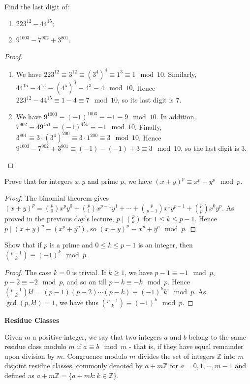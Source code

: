 \begin{prb}
Find the last digit of:
\begin{enumerate}
\item $223^{12}-44^{15}$;
\item $9^{1003}-7^{902}+3^{801}$.
\end{enumerate}
\begin{proof}
\begin{enumerate}
\item We have
$223^{12}\equiv3^{12}\equiv(3^4)^4\equiv1^3\equiv1\mod{10}$.
Similarly,
$44^{15}\equiv4^{15}\equiv(4^5)^3\equiv4^3\equiv4\mod{10}$.  Hence
$223^{12}-44^{15}\equiv1-4\equiv7\mod{10}$, so its last digit is
7. \item We have
$9^{1003}\equiv(-1)^{1003}\equiv-1\equiv9\mod{10}$.  In addition,
$7^{902}\equiv49^{451}\equiv(-1)^{451}\equiv-1\mod{10}$.  Finally,
$3^{801}\equiv3\cdot(3^4)^{200}\equiv3\cdot1^{200}\equiv3\mod{10}$.
Hence $9^{1003}-7^{902}+3^{801}\equiv(-1)-(-1)+3\equiv3\mod{10}$,
so the last digit is 3.
\end{enumerate}
\end{proof}
\end{prb}
\begin{prb}
Prove that for integers $x,y$ and prime $p$, we have $(x+y)^p\equiv x^p+y^p\mod{p}$.
\begin{proof}
The binomial theorem gives $(x+y)^p = {p\choose 0}x^py^0 + {p\choose 1}x^{p-1}y^1+\cdots+{p\choose p-1}x^1y^{p-1}+{p\choose p}x^0y^p$.  As proved in the previous day's lecture, $p \mid {p\choose k}$ for $1\le k\le p-1$.  Hence $p \mid (x+y)^p-(x^p+y^p)$, so $(x+y)^p\equiv x^p+y^p\mod{p}$.
\end{proof}
\end{prb}
\begin{prb}
Show that if $p$ is a prime and $0 \le k \le p-1$ is an integer, then ${p-1\choose k}\equiv(-1)^k\mod{p}$.
\begin{proof}
The case $k = 0$ is trivial.  If $k \ge 1$, we have $p-1 \equiv-1\mod{p}$, $p-2\equiv -2\mod{p}$, and so on till $p-k\equiv-k\mod{p}$.  Hence ${p-1\choose k}k! = (p-1)(p-2)\cdots(p-k)\equiv(-1)^kk!\mod{p}$.  As $\gcd{(p,k!)} = 1$, we have thus ${p-1\choose k}\equiv(-1)^k\mod{p}$.
\end{proof}
\end{prb}
{\large \bfseries Residue Classes}

Given $m$ a positive integer, we say that two integers $a$ and $b$ belong to the same residue class modulo $m$ if $a\equiv b\mod{m}$ - that is, if they have equal remainder upon division by $m$.  Congruence modulo $m$ divides the set of integers $\mathbb{Z}$ into $m$ disjoint residue classes, commonly denoted by $a+m\mathbb{Z}$ for $a = 0, 1, \cdots, m-1$ and defined as $a+m\mathbb{Z} = \{a+mk: k\in \mathbb{Z}\}$.

